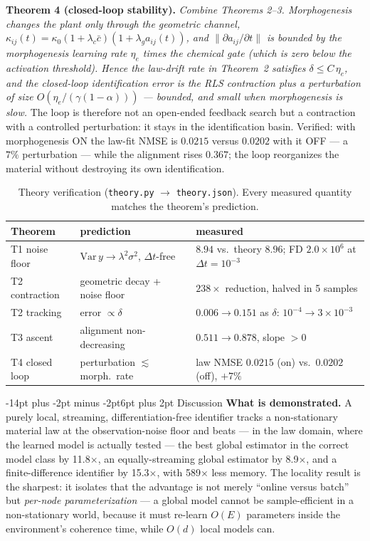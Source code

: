 \documentclass[10pt]{article}
\makeatletter
\renewcommand\section{\@startsection{section}{1}{\z@}%
  {-14pt plus -2pt minus -2pt}{6pt plus 2pt}%
  {\normalfont\bfseries\large}}
\makeatother
\begin{document}
\textbf{Theorem 4 (closed-loop stability).} \emph{Combine Theorems 2--3.
Morphogenesis changes the plant only through the geometric channel,
$\kappa_{ij}(t) = \kappa_0(1+\lambda_c\bar c)(1+\lambda_g a_{ij}(t))$, and
$\|\partial a_{ij}/\partial t\|$ is bounded by the morphogenesis learning rate
$\eta_e$ times the chemical gate (which is \emph{zero} below the activation
threshold). Hence the law-drift rate in Theorem~2 satisfies
$\delta \le C\,\eta_e$, and the closed-loop identification error is the RLS
contraction plus a perturbation of size $O(\eta_e/(\gamma(1-\alpha)))$ ---
bounded, and small when morphogenesis is slow.} The loop is therefore not an
open-ended feedback search but a contraction with a controlled perturbation:
it stays in the identification basin. Verified: with morphogenesis ON the
law-fit NMSE is $0.0215$ versus $0.0202$ with it OFF --- a $7\%$ perturbation
--- while the alignment rises $0.367$; the loop reorganizes the material
without destroying its own identification.

\begin{table}[h]
\centering\footnotesize
\caption{Theory verification (\texttt{theory.py} $\to$ \texttt{theory.json}).
Every measured quantity matches the theorem's prediction.}
\begin{tabular}{lll}
\toprule
Theorem & prediction & measured \\
\midrule
T1 noise floor & $\mathrm{Var}\,y \to \lambda^2\sigma^2$, $\Delta t$-free & $8.94$ vs.\ theory $8.96$; FD $2.0{\times}10^{6}$ at $\Delta t{=}10^{-3}$ \\
T2 contraction & geometric decay + noise floor & $238\times$ reduction, halved in 5 samples \\
T2 tracking & error $\propto \delta$ & $0.006 \to 0.151$ as $\delta$: $10^{-4}\to 3{\times}10^{-3}$ \\
T3 ascent & alignment non-decreasing & $0.511 \to 0.878$, slope $>0$ \\
T4 closed loop & perturbation $\lesssim$ morph.\ rate & law NMSE $0.0215$ (on) vs.\ $0.0202$ (off), $+7\%$ \\
\bottomrule
\end{tabular}
\end{table}

\section{Discussion}
\textbf{What is demonstrated.} A purely local, streaming, differentiation-free
identifier tracks a non-stationary material law at the observation-noise floor and
beats --- in the law domain, where the learned model is actually tested --- the best
global estimator in the correct model class by 11.8$\times$, an equally-streaming global
estimator by 8.9$\times$, and a finite-difference identifier by 15.3$\times$, with
589$\times$ less memory. The locality result is the sharpest: it isolates that the
advantage is not merely ``online versus batch'' but \emph{per-node parameterization} ---
a global model cannot be sample-efficient in a non-stationary world, because it must
re-learn $O(E)$ parameters inside the environment's coherence time, while $O(d)$ local
models can.
\end{document}
